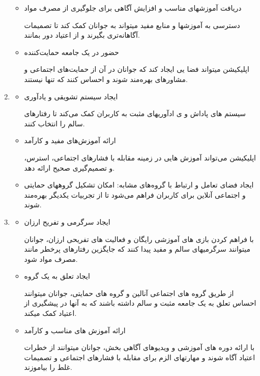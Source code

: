 \documentclass[dvipsnames, svgnames, x11names, 11pt]{article}
\begin{document}
\begin{enumerate}
\begin{itemize}
\item 
دریافت آموزشهای مناسب و افزایش آگاهی برای جلوگیری از مصرف مواد

دسترسی به آموزشها و منابع مفید میتواند به جوانان کمک کند تا تصمیمات آگاهانه‌تری بگیرند و از اعتیاد دور بمانند.

\item 
حضور در یک جامعه حمایت‌کننده

اپلیکیشن میتواند فضا یی ایجاد کند که جوانان در آن از حمایت‌های اجتماعی و مشاورهای بهره‌مند شوند و احساس کنند که تنها نیستند.
\end{itemize}

\item {}
\begin{itemize}
\item 
ایجاد سیستم تشویقی و یادآوری

سیستم های پاداش و ی ادآوریهای مثبت به کاربران کمک می‌کند تا رفتارهای سالم را انتخاب کنند.

\item 
ارائه آمو‍زش‌های مفید و کارآمد

اپلیکیشن می‌تواند آموزش هایی در زمینه مقابله با فشارهای اجتماعی، استرس، و تصمیم‌گیری صحیح ارائه دهد.

\item 
ایجاد فضای تعامل و ارتباط با گروه‌های مشابه: امکان تشکیل گروههای حمایتی و اجتماعی آنلاین برای کاربران فراهم می‌شود تا از تجربیات یکدیگر بهره‌مند شوند.
\end{itemize}

\item {}
\begin{itemize}
\item 
ایجاد سرگرمی و تفریح ارزان

با فراهم کردن بازی های آموزشی رایگان و فعالیت های تفریحی ارزان، جوانان میتوانند سرگرمیهای سالم و مفید پیدا کنند که جایگزین رفتارهای پرخطر مانند مصرف مواد شود.

\item 
ایجاد تعلق به یک گروه

از طریق گروه های اجتماعی آنالین و گروه های حمایتی، جوانان میتوانند احساس تعلق به یک جامعه مثبت و سالم داشته باشند که به آنها در پیشگیری از اعتیاد کمک میکند.

\item 
ارائه آموزش های مناسب و کارآمد

با ارائه دوره های آموزشی و ویدیوهای آگاهی بخش، جوانان میتوانند از خطرات اعتیاد آگاه شوند و مهارتهای الزم برای مقابله با فشارهای اجتماعی و تصمیمات غلط را بیاموزند.


\end{itemize}
\end{enumerate}
\end{document}
